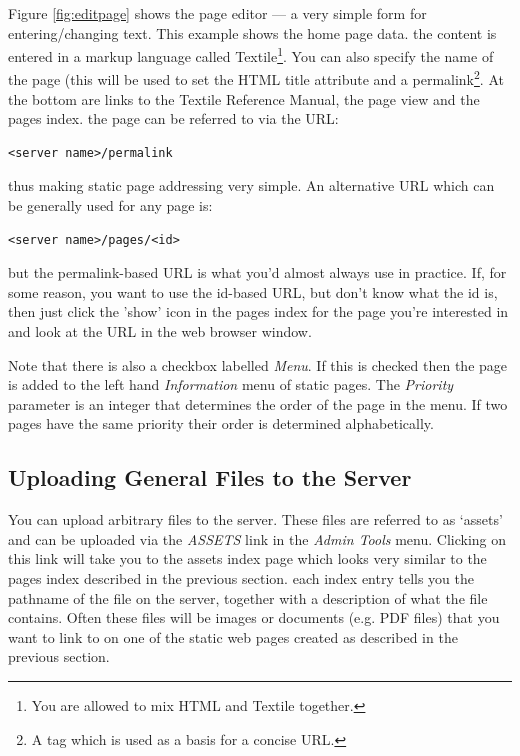 \documentclass[12pt]{article}
\begin{document}
Figure \ref{fig:editpage} shows the page editor --- a very simple form
for entering/changing text. This example shows the home page data. 
the content is entered in a markup language called Textile\footnote{You are 
allowed to mix HTML and Textile together.}. You can also specify the name
of the page (this will be used to set the HTML title attribute and a
permalink\footnote{A tag which is used as a basis for a concise URL.}.
At the bottom are links to the Textile Reference Manual, the page view
and the pages index. the page can be referred to via the URL:
\begin{verbatim}
<server name>/permalink
\end{verbatim}
thus making static page addressing very simple.
An alternative URL which can be generally used for any page is:
\begin{verbatim}
<server name>/pages/<id>
\end{verbatim}
but the permalink-based URL is what you'd almost always use in practice.
If, for some reason, you want to use the id-based URL, but don't know
what the id is, then just click the 'show' icon in the pages index for
the page you're interested in and look at the URL in the web browser window.

Note that there is also a checkbox labelled \emph{Menu}. If this is
checked then the page is added to the left hand \emph{Information} menu
of static pages. The \emph{Priority} parameter is an integer that
determines the order of the page in the menu. If two pages have the same
priority their order is determined alphabetically.

\subsection{Uploading General Files to the Server}
You can upload arbitrary files to the server. These files are referred
to as `assets' and can be uploaded via the \emph{ASSETS} link in the
\emph{Admin Tools} menu. Clicking on this link will take you to the
assets index page which looks very similar to the pages index described
in the previous section.
each index entry tells you the pathname of the file on the server,
together with a description of what the file contains. Often these files
will be images or documents (e.g. PDF files) that you want to link to
on one of the static web pages created as described in the previous
section.
\end{document}
